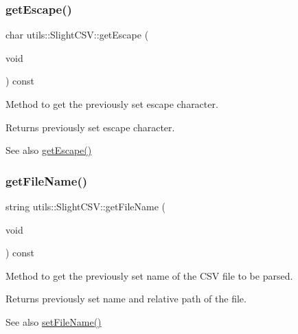 \subsubsection{\texorpdfstring{get\+Escape()}{getEscape()}}
{\footnotesize\ttfamily char utils\+::\+Slight\+C\+S\+V\+::get\+Escape (\begin{DoxyParamCaption}\item[{void}]{ }\end{DoxyParamCaption}) const}

Method to get the previously set escape character. \begin{DoxyReturn}{Returns}
previously set escape character. 
\end{DoxyReturn}
\begin{DoxySeeAlso}{See also}
\hyperlink{classutils_1_1SlightCSV_ab821a07daafa1ccaf8468ac485b226b0}{get\+Escape()} 
\end{DoxySeeAlso}
\mbox{\label{classutils_1_1SlightCSV_ad689937346e0d6dd37597e7c3458e164}} 
\subsubsection{\texorpdfstring{get\+File\+Name()}{getFileName()}}
{\footnotesize\ttfamily string utils\+::\+Slight\+C\+S\+V\+::get\+File\+Name (\begin{DoxyParamCaption}\item[{void}]{ }\end{DoxyParamCaption}) const}

Method to get the previously set name of the C\+SV file to be parsed. \begin{DoxyReturn}{Returns}
previously set name and relative path of the file. 
\end{DoxyReturn}
\begin{DoxySeeAlso}{See also}
\hyperlink{classutils_1_1SlightCSV_a9567504e450440a9564053c8ab6f6ff9}{set\+File\+Name()} 
\end{DoxySeeAlso}
\mbox{\label{classutils_1_1SlightCSV_a781ae99927f2b8d704add6a2a53e0051}} 
